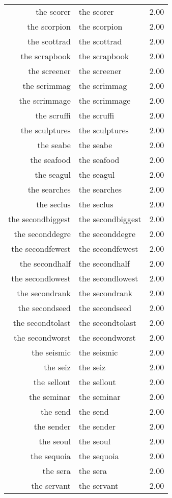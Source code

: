 \begin{table}[ht]
\begin{tabular}{rlr}
  the scorer & the scorer & 2.00 \\ 
  the scorpion & the scorpion & 2.00 \\ 
  the scottrad & the scottrad & 2.00 \\ 
  the scrapbook & the scrapbook & 2.00 \\ 
  the screener & the screener & 2.00 \\ 
  the scrimmag & the scrimmag & 2.00 \\ 
  the scrimmage & the scrimmage & 2.00 \\ 
  the scruffi & the scruffi & 2.00 \\ 
  the sculptures & the sculptures & 2.00 \\ 
  the seabe & the seabe & 2.00 \\ 
  the seafood & the seafood & 2.00 \\ 
  the seagul & the seagul & 2.00 \\ 
  the searches & the searches & 2.00 \\ 
  the seclus & the seclus & 2.00 \\ 
  the secondbiggest & the secondbiggest & 2.00 \\ 
  the seconddegre & the seconddegre & 2.00 \\ 
  the secondfewest & the secondfewest & 2.00 \\ 
  the secondhalf & the secondhalf & 2.00 \\ 
  the secondlowest & the secondlowest & 2.00 \\ 
  the secondrank & the secondrank & 2.00 \\ 
  the secondseed & the secondseed & 2.00 \\ 
  the secondtolast & the secondtolast & 2.00 \\ 
  the secondworst & the secondworst & 2.00 \\ 
  the seismic & the seismic & 2.00 \\ 
  the seiz & the seiz & 2.00 \\ 
  the sellout & the sellout & 2.00 \\ 
  the seminar & the seminar & 2.00 \\ 
  the send & the send & 2.00 \\ 
  the sender & the sender & 2.00 \\ 
  the seoul & the seoul & 2.00 \\ 
  the sequoia & the sequoia & 2.00 \\ 
  the sera & the sera & 2.00 \\ 
  the servant & the servant & 2.00 \\ 

\end{tabular}
\end{table}
